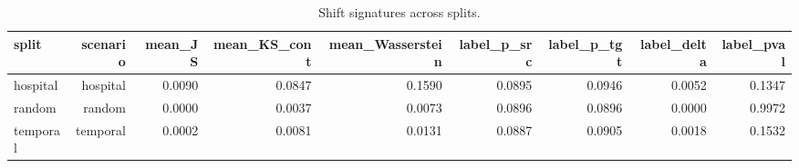 \begin{table}
\caption{Shift signatures across splits.}
\label{tab:shift-signature}
\begin{tabular}{lrrrrrrrr}
\toprule
split & scenario & mean\_JS & mean\_KS\_cont & mean\_Wasserstein & label\_p\_src & label\_p\_tgt & label\_delta & label\_pval \\
\midrule
hospital & hospital & 0.0090 & 0.0847 & 0.1590 & 0.0895 & 0.0946 & 0.0052 & 0.1347 \\
random & random & 0.0000 & 0.0037 & 0.0073 & 0.0896 & 0.0896 & 0.0000 & 0.9972 \\
temporal & temporal & 0.0002 & 0.0081 & 0.0131 & 0.0887 & 0.0905 & 0.0018 & 0.1532 \\
\bottomrule
\end{tabular}
\end{table}
